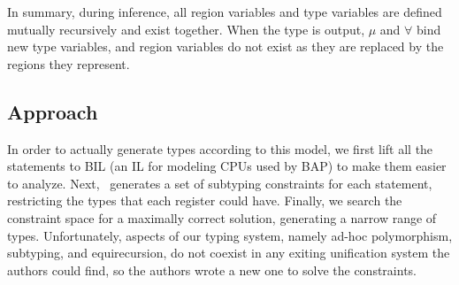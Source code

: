 In summary, during inference, all region variables and type variables are defined mutually recursively and exist together. When the type is output, $\mu$ and $\forall$ bind new type variables, and region variables do not exist as they are replaced by the regions they represent.

\subsection{Approach}
In order to actually generate types according to this model, we first lift all the statements to BIL\cite{bap} (an IL for modeling CPUs used by BAP) to make them easier to analyze. Next, \bitr\ generates a set of subtyping constraints for each statement, restricting the types that each register could have. Finally, we search the constraint space for a maximally correct solution, generating a narrow range of types. Unfortunately, aspects of our typing system, namely ad-hoc polymorphism, subtyping, and equirecursion, do not coexist in any exiting unification system the authors could find, so the authors wrote a new one to solve the constraints.
